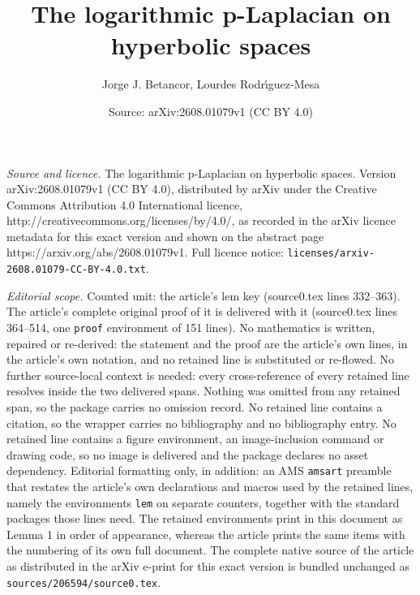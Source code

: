 \documentclass[10pt,a4paper]{amsart}
\title{The logarithmic p-Laplacian on hyperbolic spaces}
\author{Jorge J. Betancor, Lourdes Rodr\'{\i}guez-Mesa}
\date{Source: arXiv:2608.01079v1 (CC BY 4.0)}
\begin{document}
\maketitle

\noindent\emph{Source and licence.} The logarithmic p-Laplacian on hyperbolic spaces. Version arXiv:2608.01079v1 (CC BY 4.0), distributed by arXiv under the Creative Commons Attribution 4.0 International licence, http://creativecommons.org/licenses/by/4.0/, as recorded in the arXiv licence metadata for this exact version and shown on the abstract page https://arxiv.org/abs/2608.01079v1. Full licence notice: \texttt{licenses/arxiv-2608.01079-CC-BY-4.0.txt}.\par\smallskip

\noindent\textit{Editorial scope.} Counted unit: the article's lem key (source0.tex lines 332--363). The article's complete original proof of it is delivered with it (source0.tex lines 364--514, one \texttt{proof} environment of 151 lines). No mathematics is written, repaired or re-derived: the statement and the proof are the article's own lines, in the article's own notation, and no retained line is substituted or re-flowed.  No further source-local context is needed: every cross-reference of every retained line resolves inside the two delivered spans.  Nothing was omitted from any retained span, so the package carries no omission record.  No retained line contains a citation, so the wrapper carries no bibliography and no bibliography entry.  No retained line contains a figure environment, an image-inclusion command or drawing code, so no image is delivered and the package declares no asset dependency.  Editorial formatting only, in addition: an AMS \texttt{amsart} preamble that restates the article's own declarations and macros used by the retained lines, namely the environments \texttt{lem} on separate counters, together with the standard packages those lines need.  The retained environments print in this document as Lemma 1 in order of appearance, whereas the article prints the same items with the numbering of its own full document.  The complete native source of the article as distributed in the arXiv e-print for this exact version is bundled unchanged as \texttt{sources/206594/source0.tex}.
\end{document}
